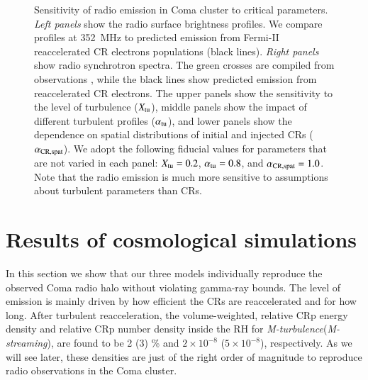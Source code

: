 \documentclass[a4paper,fleqn,usenatbib]{mnras}
\newcommand{\Mstream}{{\it M-streaming}\xspace}
\newcommand{\Mflatturb}{{\it M-turbulence}\xspace}
\begin{document}
\begin{figure}
\caption{Sensitivity of radio emission in Coma cluster to critical
  parameters. {\it Left panels} show the radio surface brightness
  profiles. We compare profiles at 352~MHz \citep[blue lines and
    crosses,][]{brown11} to predicted emission from Fermi-II
  reaccelerated CR electrons populations (black lines). {\it Right
    panels} show radio synchrotron spectra. The green crosses are
  compiled from observations \citet{2010PhDT.......259P}, while the
  black lines show predicted emission from reaccelerated CR
  electrons. The upper panels show the sensitivity to the level of
  turbulence ($X_{\mathrm{tu}}$), middle panels show the impact of
  different turbulent profiles ($\alpha_{\mathrm{tu}}$), and lower panels
  show the dependence on spatial distributions of initial and injected
  CRs ($\alpha_{\mathrm{CR,spat}}$). We adopt the following fiducial values
  for parameters that are not varied in each panel: $X_{\mathrm{tu}}=0.2$,
  $\alpha_{\mathrm{tu}}=0.8$, and $\alpha_{\mathrm{CR,spat}}=1.0$. Note that the
  radio emission is much more sensitive to assumptions about turbulent
  parameters than CRs.}
  \label{fig:param_comp}
\end{figure}



\section{Results of cosmological simulations}
\label{sec:results}

In this section we show that our three models individually reproduce
the observed Coma radio halo without violating gamma-ray bounds. The
level of emission is mainly driven by how efficient the CRs are
reaccelerated and for how long. After turbulent reacceleration, the
volume-weighted, relative CRp energy density and relative CRp number
density inside the RH for \Mflatturb (\Mstream), are found to be 2 (3)
\% and $2\times10^{-8}$ ($5\times10^{-8}$), respectively. As we will
see later, these densities are just of the right order of magnitude to
reproduce radio observations in the Coma cluster.
\end{document}
